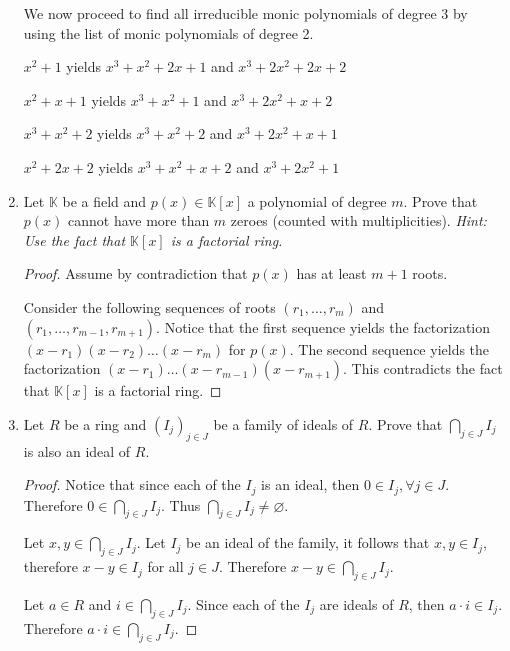 \documentclass[12pt]{article}
\begin{document}
\begin{enumerate}
    We now proceed to find all irreducible monic polynomials of degree 3 by using the list of monic polynomials of degree 2.
    
    
    $x^2 +1 $ yields $x^3 + x^2 +2x+1 $ and $x^3 + 2 x^2 + 2x + 2$
    
    $x^2+x+1$ yields $x^3 +x^2+1$ and $x^3+2x^2+x+2$
    
    $x^3+x^2+2$ yields $x^3+x^2+2$ and $x^3+2x^2+x+1$
    
    $x^2 +2x+2$ yields $x^3+x^2+x+2$ and $x^3+2x^2+1$
    
    \item Let $\mathbb{K}$ be a field and $p(x) \in \mathbb{K}[x]$ a polynomial of degree $m$. Prove that $p(x)$ cannot have more than $m$ zeroes (counted with multiplicities). \emph{Hint: Use the fact that $\mathbb{K}[x]$ is a factorial ring.}
    \begin{proof}
    Assume by contradiction that $p(x)$ has at least $m+1$ roots.
    
    Consider the following sequences of roots $(r_1, \ldots, r_m)$ and $(r_1, \ldots, r_{m-1},r_{m+1})$. Notice that the first sequence yields the factorization $(x-r_1) (x-r_2) \ldots (x-r_m)$ for $p(x)$. The second sequence yields the factorization $(x-r_1) \ldots (x-r_{m-1}) (x-r_{m+1})$. This contradicts the fact that $\mathbb{K}[x]$ is a factorial ring.
    \end{proof}
    
    \pagebreak
    \item Let $R$ be a ring and $(I_j)_{j \in J}$ be a family of ideals of $R$. Prove that $\displaystyle\bigcap \limits_{j \in J} I_j$ is also an ideal of $R$.
    
    \begin{proof}
     Notice that since each of the $I_j$ is an ideal, then $0 \in I_j, \forall j \in J$. Therefore $0 \in \displaystyle\bigcap \limits_{j \in J} I_j$. Thus $\displaystyle\bigcap \limits_{j \in J} I_j \neq \varnothing$.
     
     
     Let $x, y \in \displaystyle\bigcap \limits_{j \in J} I_j$. Let $I_j$ be an ideal of the family, it follows that $x,y \in I_j$, therefore $x-y \in I_j$ for all $j \in J$. Therefore $x-y \in \displaystyle\bigcap \limits_{j \in J} I_j$.
     
     Let $a \in R$ and $i \in \displaystyle\bigcap \limits_{j \in J} I_j$. Since each of the $I_j$ are ideals of $R$, then $a \cdot i \in I_j$. Therefore $a\cdot i \in \displaystyle\bigcap \limits_{j \in J} I_j$.
     

\end{proof}
\end{enumerate}
\end{document}
